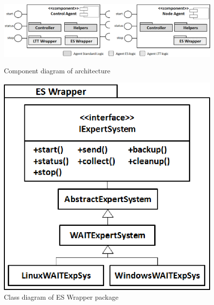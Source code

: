 \documentclass[runningheads,a4paper]{llncs}
\begin{document}
\begin{figure}
\centering
\begin{minipage}[b]{.67\textwidth}

\centering
\includegraphics[totalheight=.24\textheight,width=1.0\textwidth]{Components}
\caption{Component diagram of architecture}
\label{fig_components}

\end{minipage}\qquad
\begin{minipage}[b]{.27\textwidth}

\centering
\includegraphics[totalheight=.24\textheight,width=1.0\textwidth]{Wrapper}
\caption{Class diagram of ES Wrapper package}
\label{fig_wrapper}

\end{minipage}
\end{figure}
\end{document}
